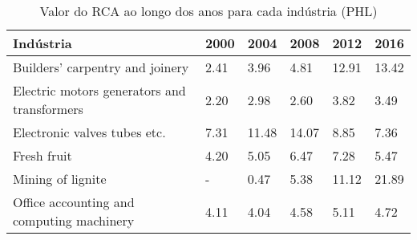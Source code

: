 \begin{table}
\centering
\caption{Valor do RCA ao longo dos anos para cada indústria (PHL)}
\begin{tabular}{p{6cm}p{1.5cm}p{1.5cm}p{1.5cm}p{1.5cm}p{1.5cm}}
\toprule
                                  Indústria & 2000 &  2004 &  2008 &  2012 &  2016 \\
\midrule
            Builders' carpentry and joinery & 2.41 &  3.96 &  4.81 & 12.91 & 13.42 \\
Electric motors generators and transformers & 2.20 &  2.98 &  2.60 &  3.82 &  3.49 \\
               Electronic valves tubes etc. & 7.31 & 11.48 & 14.07 &  8.85 &  7.36 \\
                                Fresh fruit & 4.20 &  5.05 &  6.47 &  7.28 &  5.47 \\
                          Mining of lignite &    - &  0.47 &  5.38 & 11.12 & 21.89 \\
  Office accounting and computing machinery & 4.11 &  4.04 &  4.58 &  5.11 &  4.72 \\
\bottomrule
\end{tabular}
\end{table}
